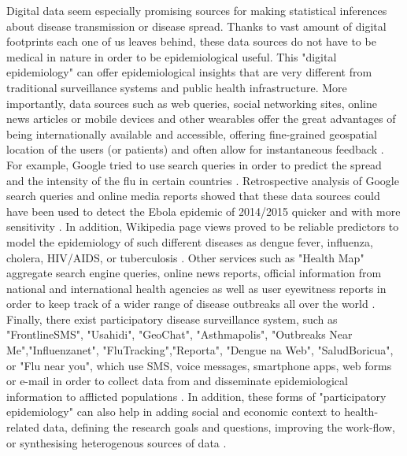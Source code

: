 \documentclass[11pt, a4paper]{report}\usepackage[]{graphicx}\usepackage[]{color}
\begin{document}
Digital data seem especially promising sources for making statistical inferences about disease transmission or disease spread. Thanks to vast amount of digital footprints each one of us leaves behind, these data sources do not have to be medical in nature in order to be epidemiological useful. This "digital epidemiology" can offer epidemiological insights that are very different from traditional surveillance systems and public health infrastructure. More importantly, data sources such as web queries, social networking sites, online news articles or mobile devices and other wearables offer the great advantages of being internationally available and accessible, offering fine-grained geospatial location of the users (or patients) and often allow for instantaneous feedback \citep{salathe_digital_2012}. For example, Google tried to use search queries in order to predict the spread and the intensity of the flu in certain countries \citep{ginsberg_detecting_2009}. Retrospective analysis of Google search queries and online media reports showed that these data sources could have been used to detect the Ebola epidemic of 2014/2015 quicker and with more sensitivity \citep{anema_digital_2014, milinovich_role_2015}.
In addition, Wikipedia page views proved to be reliable predictors to model the epidemiology of such different diseases as dengue fever, influenza, cholera, HIV/AIDS, or tuberculosis \citep{generous_global_2014}. 
Other services such as "Health Map" aggregate search engine queries, online news reports, official information from national and international health agencies as well as user eyewitness reports in order to keep track of a wider range of disease outbreaks all over the world \citep{brownstein_surveillance_2008,freifeld_healthmap:_2008}.
Finally, there exist participatory disease surveillance system, such as "FrontlineSMS", "Usahidi", "GeoChat", "Asthmapolis", "Outbreaks Near Me","Influenzanet", "FluTracking","Reporta", "Dengue na Web", "SaludBoricua", or "Flu near you", which use SMS, voice messages, smartphone apps, web forms or e-mail in order to collect data from and disseminate epidemiological information to afflicted populations \citep{freifeld_participatory_2010,chunara_flu_2013,wojcik_public_2014,chunara_estimating_2015}. In addition, these forms of "participatory epidemiology" can also help in adding social and economic context to health-related data, defining the research goals and questions, improving the work-flow, or synthesising heterogenous sources of data \citep{bach_participatory_2017,liu_assessing_2017}.\newline
\end{document}
